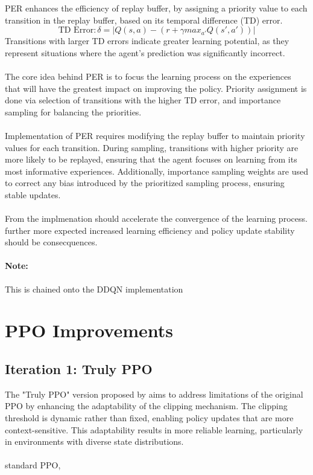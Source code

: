 \documentclass[
12pt, %
oneside, %
english, %
onehalfspacing, %
nolistspacing, %
liststotoc, %
headsepline, %
]{ProposalAndThesis} %
\begin{document}
PER \parencite{schaul_prioritized_2016} enhances the efficiency of replay buffer, by assigning a priority value to each transition in the replay buffer, based on its temporal difference (TD) error. 
\[\text{TD Error}: \delta = |Q(s,a) - (r + \gamma max_{a'}Q(s',a'))|\]
Transitions with larger TD errors indicate greater learning potential, as they represent situations where the agent's prediction was significantly incorrect.
\\\\
\noindent The core idea behind PER is to focus the learning process on the experiences that will have the greatest impact on improving the policy. Priority assignment is done via selection of transitions with the higher TD error, and importance sampling for balancing the priorities.
\\\\
\noindent Implementation of PER requires modifying the replay buffer to maintain priority values for each transition. During sampling, transitions with higher priority are more likely to be replayed, ensuring that the agent focuses on learning from its most informative experiences. Additionally, importance sampling weights are used to correct any bias introduced by the prioritized sampling process, ensuring stable updates.
\\\\
\noindent From \parencite{schaul_prioritized_2016} the implmenation should accelerate the convergence of the learning process. further more expected increased learning efficiency and policy update stability should be consecquences.

\paragraph{Note:} This is chained onto the DDQN implementation

\section{PPO Improvements}

\subsection{Iteration 1: Truly PPO}

The "Truly PPO" version proposed by \parencite{wang_truly_2019} aims to address limitations of the original PPO by enhancing the adaptability of the clipping mechanism. The clipping threshold is dynamic rather than fixed, enabling policy updates that are more context-sensitive. This adaptability results in more reliable learning, particularly in environments with diverse state distributions.
\\\\
standard PPO,
\end{document}
